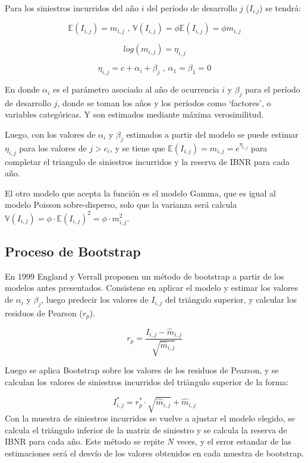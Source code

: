 \documentclass[
  12pt,
]{article}
\begin{document}
Para los siniestros incurridos del año \(i\) del período de desarrollo
\(j\) (\(I_{i.j}\)) se tendrá:

\[
\mathbb{E}(I_{i,j}) = m_{i,j} \text{   ,    }   \mathbb{V}(I_{i,j})=\phi\mathbb{E}(I_{i,j})=\phi m_{i,j}
\]

\[
log(m_{i,j}) = \eta_{i,j}
\]

\[
\eta_{i,j}= c + \alpha_i + \beta_j  \text{   ,  } \alpha_1=\beta_1=0
\]

En donde \(\alpha_i\) es el parámetro asociado al año de ocurrencia
\(i\) y \(\beta_j\) para el período de desarrollo \(j\), donde se toman
los años y los períodos como `factores', o variables categóricas. Y son
estimados mediante máxima verosimilitud.

Luego, con los valores de \(\alpha_i\) y \(\beta_j\) estimados a partir
del modelo se puede estimar \(\eta_{i,j}\) para los valores de
\(j>c_i\), y se tiene que
\(\mathbb{E}(I_{i,j}) = m_{i,j} = e^{\eta_{i,j}}\) para completar el
triangulo de siniestros incurridos y la reserva de IBNR para cada año.

El otro modelo que acepta la función es el modelo Gamma, que es igual al
modelo Poisson sobre-disperso, solo que la varianza será calcula
\(\mathbb{V}(I_{i,j}) = \phi\cdot \mathbb{E}(I_{i,j})^2=\phi \cdot m_{i,j}^2\).

\subsection{Proceso de Bootstrap}\label{proceso-de-bootstrap}

En 1999 England y Verrall proponen un método de bootstrap a partir de
los modelos antes presentados. Consistene en aplicar el modelo y estimar
los valores de \(\alpha_i\) y \(\beta_j\), luego predecir los valores de
\(I_{i,j}\) del triángulo superior, y calcular los residuos de Pearson
(\(r_p\)).

\[
r_p = \frac{I_{i,j}-\hat{m}_{i,j}}{\sqrt{\hat{m}_{i,j}}}
\]

Luego se aplica Bootstrap sobre los valores de los residuos de Pearson,
y se calculan los valores de siniestros incurridos del triángulo
superior de la forma:

\[
I^*_{i,j} = r^*_p\cdot\sqrt{\hat{m}_{i,j}} + \hat{m}_{i,j}
\] Con la muestra de siniestros incurridos se vuelve a ajustar el modelo
elegido, se calcula el triángulo inferior de la matriz de siniestro y se
calcula la reserva de IBNR para cada año. Este método se repite \(N\)
veces, y el error estandar de las estimaciones será el desvío de los
valores obtenidos en cada muestra de bootstrap.
\end{document}
